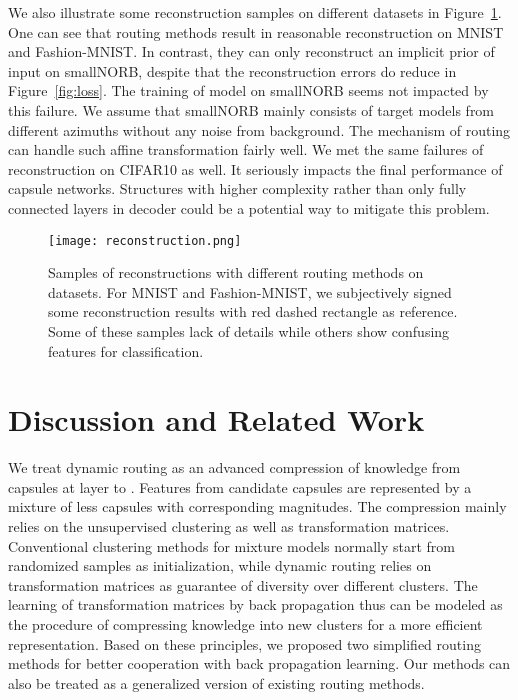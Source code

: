 \documentclass[runningheads]{llncs}
\begin{document}
We also illustrate some reconstruction samples on different datasets in Figure~\ref{fig:recon}. One can see that routing methods result in reasonable reconstruction on MNIST and Fashion-MNIST. In contrast, they can only reconstruct an implicit prior of input on smallNORB, despite that the reconstruction errors do reduce in Figure~\ref{fig:loss}. The training of model on smallNORB seems not impacted by this failure. We assume that smallNORB mainly consists of target models from different azimuths without any noise from background. The mechanism of routing can handle such affine transformation fairly well. We met the same failures of reconstruction on CIFAR10 as well. It seriously impacts the final performance of capsule networks. Structures with higher complexity rather than only fully connected layers in decoder could be a potential way to mitigate this problem.
\begin{figure}
\centering
\texttt{[image: reconstruction.png]}
\caption{Samples of reconstructions with different routing methods on datasets. For MNIST and Fashion-MNIST, we subjectively signed some reconstruction results with red dashed rectangle as reference. Some of these samples lack of details while others show confusing features for classification.}
\label{fig:recon}
\end{figure}



\section{Discussion and Related Work}

We treat dynamic routing as an advanced compression of knowledge from capsules at layer  to . Features from candidate capsules are represented by a mixture of less capsules with corresponding magnitudes. The compression mainly relies on the unsupervised clustering as well as transformation matrices. Conventional clustering methods for mixture models normally start from randomized samples as initialization, while dynamic routing relies on transformation matrices as guarantee of diversity over different clusters. The learning of transformation matrices by back propagation thus can be modeled as the procedure of compressing knowledge into new clusters for a more efficient representation. Based on these principles, we proposed two simplified routing methods for better cooperation with back propagation learning. Our methods can also be treated as a generalized version of existing routing methods.
\end{document}
